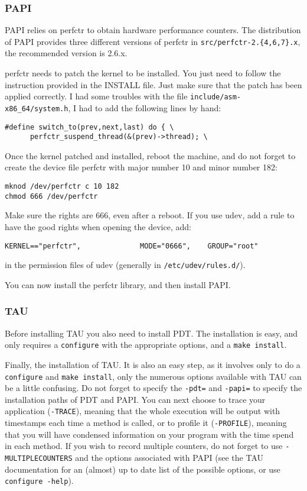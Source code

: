 \subsubsection{PAPI}

PAPI relies on perfctr to obtain hardware performance counters. The
distribution of PAPI provides three different versions of perfctr in
\texttt{src/perfctr-2.\{4,6,7\}.x}, the recommended version is
2.6.x.

perfctr needs to patch the kernel to be installed. You just need to
follow the instruction provided in the INSTALL file. Just make sure
that the patch has been applied correctly. I had some troubles with
the file \texttt{include/asm-x86\_64/system.h}, I had to add the following lines by hand:
\begin{verbatim}
#define switch_to(prev,next,last) do { \
      perfctr_suspend_thread(&(prev)->thread); \
\end{verbatim}

Once the kernel patched and installed, reboot the machine, and do not
forget to create the device file perfctr with major number 10 and
minor number 182:
\begin{verbatim}
mknod /dev/perfctr c 10 182
chmod 666 /dev/perfctr
\end{verbatim}
Make sure the rights are 666, even after a reboot. If you use udev,
add a rule to have the good rights when opening the device, add:
\begin{verbatim}
KERNEL=="perfctr",              MODE="0666",    GROUP="root"
\end{verbatim}
in the permission files of udev (generally in
\texttt{/etc/udev/rules.d/}).

You can now install the perfctr library, and then install PAPI.


\subsubsection{TAU}
Before installing TAU you also need to install PDT. The installation
is easy, and only requires a \texttt{configure} with the appropriate
options, and a \texttt{make install}.

Finally, the installation of TAU. It is also an easy step, as it
involves only to do a \texttt{configure} and \texttt{make install},
only the numerous options available with TAU can be a little
confusing. Do not forget to specify the \texttt{-pdt=} and
\texttt{-papi=} to specify the installation paths of PDT and PAPI. You
can next choose to trace your application (\texttt{-TRACE}), meaning
that the whole execution will be output with timestamps each time a
method is called, or to profile it (\texttt{-PROFILE}), meaning that
you will have condensed information on your program with the time
spend in each method. If you wish to record multiple counters, do not
forget to use \texttt{-MULTIPLECOUNTERS} and the options associated
with PAPI (see the TAU documentation for an (almost) up to date list
of the possible options, or use \texttt{configure -help}).

